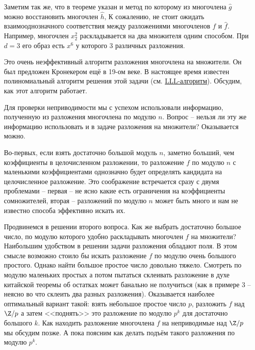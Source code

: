 Заметим так же, что в теореме указан и метод по которому из многочлена $\hat{g}$ можно восстановить многочлен $\hat h$,
К сожалению, не стоит ожидать взаимооднозначного соответствия между разложениями многочленов $f$ и $\hat{f}$. Например, многочлен $x_2^2$ раскладывается на два множителя одним способом. При $d=3$ его образ есть $x^6$ у которого 3 различных разложения.

Это очень неэффективный алгоритм разложения многочлена на множители. Он был предложен Кронекером ещё в 19-ом веке. В настоящее время известен полиномиальный алгоритм решения этой задачи (см. \href{http://www.math.leidenuniv.nl/%7Ehwl/PUBLICATIONS/1982f/art.pdf}{LLL-алгоритм}). Обсудим, как этот алгоритм работает.

Для проверки неприводимости мы с успехом использовали информацию, полученную из разложения многочлена по модулю $n$. Вопрос -- нельзя ли эту же информацию использовать и в задаче разложения на множители? Оказывается можно.

Во-первых, если взять достаточно большой модуль $n$, заметно больший, чем коэффициенты в целочисленном разложении, то разложение $f$ по модулю $n$ с маленькими коэффициентами однозначно будет определять кандидата на целочисленное разложение. Это соображение встречается сразу с двумя проблемами -- первая -- не ясно какие есть ограничения на коэффициенты сомножителей, вторая -- разложений по модулю $n$ может быть много и нам не известно способа эффективно искать их.



Продвинемся в решении второго вопроса. Как же  выбрать достаточно большое число, по модулю которого удобно раскладывать многочлен $f$ на множители? Наибольшим удобством в решении задачи разложения обладают поля. В этом смысле возможно стоило бы искать разложение $f$ по модулю очень большого простого. Однако найти большое простое число довольно тяжело. Смотреть по модулю маленьких простых а потом пытаться склеивать разложение в духе китайской теоремы об остатках может банально не получиться (как в примере 3 -- неясно во что склеить два разных разложения). Оказывается наиболее оптимальный вариант такой: взять небольшое простое число $p$, разложить $f$ над $\Z/p$ а затем <<поднять>> это разложение по модулю $p^k$ для достаточно большого $k$. Как находить разложение многочлена $f$ на неприводимые над $\Z/p$ мы обсудим позже. А пока поясним как делать подъём такого разложения по модулю $p^k$.

